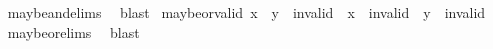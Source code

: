 \begin{isabellebody}
%
\isadelimproof
\ \ %
\endisadelimproof
%
\isatagproof
{}\isamarkupfalse%
\ maybe{\isacharunderscore}and{\isachardot}elims\ \isamarkupfalse%
\ blast%
\endisatagproof
{\isafoldproof}%
%
\isadelimproof
\isanewline
%
\endisadelimproof
\isanewline
{}\isamarkupfalse%
\ maybe{\isacharunderscore}or{\isacharunderscore}valid{\isacharcolon}\ {\isachardoublequoteopen}x\ {\isasymor}\isactrlsub {\isacharquery}\ y\ {\isasymnoteq}\ invalid\ {\isasymLongrightarrow}\ x\ {\isasymnoteq}\ invalid\ {\isasymand}\ y\ {\isasymnoteq}\ invalid{\isachardoublequoteclose}\isanewline
%
\isadelimproof
\ \ %
\endisadelimproof
%
\isatagproof
{}\isamarkupfalse%
\ maybe{\isacharunderscore}or{\isachardot}elims\ \isamarkupfalse%
\ blast%
\endisatagproof
{\isafoldproof}%
%
\isadelimproof
\isanewline
%
\endisadelimproof
%
\isadelimtheory
%
\endisadelimtheory
%
\isatagtheory
{}\isamarkupfalse%
%
\endisatagtheory
{\isafoldtheory}%
%
\isadelimtheory
%
\endisadelimtheory
%
\end{isabellebody}%
\endinput

